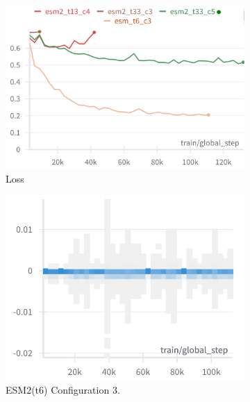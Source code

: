 \begin{figure}[h]
	\centering
	
	\begin{subfigure}[b]{0.45\textwidth}
		\centering
		\includegraphics[width=\textwidth]{../img/results/loss2}
		\caption{Loss}
		\label{fig:loss}
	\end{subfigure}
	\hfill
	\begin{subfigure}[b]{0.45\textwidth}
		\centering
		\includegraphics[width=\textwidth]{../img/results/t6_c3_gradients}
		\caption{ESM2(t6) Configuration 3.}
		\label{fig:t6_c3_gradients}
	\end{subfigure}
	\hfill
	\begin{subfigure}[b]{0.45\textwidth}
		\centering

\end{subfigure}
\end{figure}
